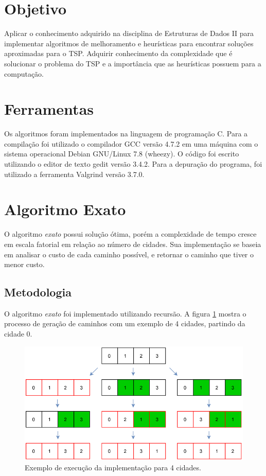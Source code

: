 \documentclass[a4paper,12pt]{article}
\begin{document}
\section{Objetivo}
Aplicar o conhecimento adquirido na disciplina de Estruturas de Dados II para implementar algoritmos 
de melhoramento e heurísticas para encontrar soluções aproximadas para o TSP.
Adquirir conhecimento da complexidade que é solucionar o problema do TSP e a importância que as heurísticas 
possuem para a computação.

\section{Ferramentas}
Os algoritmos foram implementados na linguagem de programação C. Para a compilação foi 
utilizado o compilador GCC versão 4.7.2 em uma máquina com o sistema operacional Debian 
GNU/Linux 7.8 (wheezy).
O código foi escrito utilizando o editor de texto gedit versão 3.4.2.
Para a depuração do programa, foi utilizado a ferramenta Valgrind versão 3.7.0.

\section{Algoritmo Exato}
O algoritmo \emph{exato} possui solução ótima, porém a complexidade de tempo cresce em escala fatorial em relação 
ao número de cidades. Sua implementação se baseia em analisar o custo de cada caminho possível, e retornar o caminho 
que tiver o menor custo.

\subsection{Metodologia}
O algoritmo \emph{exato} foi implementado utilizando recursão. A figura \ref{Diagrama Exato} mostra o processo de geração de caminhos com 
um exemplo de 4 cidades, partindo da cidade 0. 

\begin{figure}[h!]
\centering
\includegraphics[width=140mm]{ExatoDiagramPng.png}
\caption{Exemplo de execução da implementação para 4 cidades.} \label{Diagrama Exato}
\end{figure}
\end{document}
